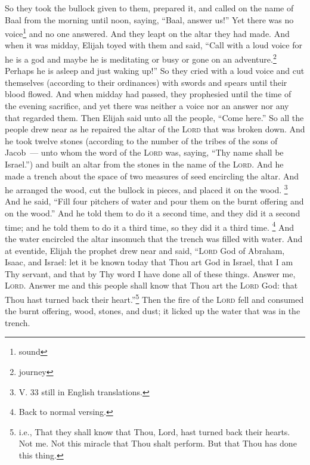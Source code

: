 \begin{inparaenum}
     So they took the bullock given to them, prepared it, and called on the name of Baal from the morning until noon, saying, ``Baal, answer us!'' Yet there was no voice\footnote{sound} and no one answered. And they leapt on the altar they had made.%
     And when it was midday, Elijah toyed with them and said, ``Call with a loud voice for he is a god and maybe he is meditating or busy or gone on an adventure.\footnote{journey} Perhaps he is asleep and just waking up!''%
     So they cried with a loud voice and cut themselves (according to their ordinances) with swords and spears until their blood flowed.%
     And when midday had passed, they prophesied until the time of the evening sacrifice, and yet there was neither a voice nor an answer nor any that regarded them.%
     Then Elijah said unto all the people, ``Come here.'' So all the people drew near as he repaired the altar of the \textsc{Lord} that was broken down.%
     And he took twelve stones (according to the number of the tribes of the sons of Jacob~--- unto whom the word of the \textsc{Lord} was, saying, ``Thy name shall be Israel.'')%
     and built an altar from the stones in the name of the \textsc{Lord}. And he made a trench about the space of two measures of seed encircling the altar.%
     And he arranged the wood, cut the bullock in pieces, and placed it on the wood.%
     \footnote{V. 33 still in English translations.} And he said, ``Fill four pitchers of water and pour them on the burnt offering and on the wood.'' And he told them to do it a second time, and they did it a second time; and he told them to do it a third time, so they did it a third time.%
     \footnote{Back to normal versing.} And the water encircled the altar insomuch that the trench was filled with water.%
     And at eventide, Elijah the prophet drew near and said, ``\textsc{Lord} God of Abraham, Isaac, and Israel: let it be known today that Thou art God in Israel, that I am Thy servant, and that by Thy word I have done all of these things.%
     Answer me, \textsc{Lord}. Answer me and this people shall know that Thou art the \textsc{Lord} God: that Thou hast turned back their heart.''\footnote{i.e., That they shall know that Thou, Lord, hast turned back their hearts. Not me. Not this miracle that Thou shalt perform. But that Thou has done this thing.}%
     Then the fire of the \textsc{Lord} fell and consumed the burnt offering, wood, stones, and dust; it licked up the water that was in the trench.%

\end{inparaenum}
